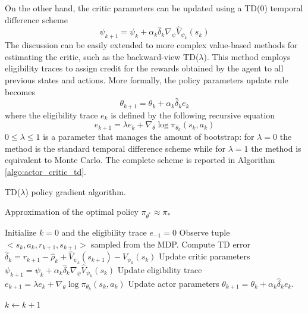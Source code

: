 On the other hand, the critic parameters can be updated using a TD(0) temporal difference scheme
\begin{equation}
	\psi_{k+1} = \psi_k + \alpha_k \widehat{\delta}_k \nabla_\psi \widehat{V}_{\psi_k}(s_k)
\end{equation}
The discussion can be easily extended to more complex value-based methods for estimating the critic, such as the backward-view TD($\lambda$). This method employs eligibility traces to assign credit for the rewards obtained by the agent to all previous states and actions. More formally, the policy parameters update rule becomes
\begin{equation}
	\theta_{k+1} = \theta_k + \alpha_k \widehat{\delta}_k e_k
\end{equation}
where the eligibility trace $e_k$ is defined by the following recursive equation 
\begin{equation}
	e_{k+1} = \lambda e_k + \nabla_\theta\log \pi_{\theta_k}(s_k,a_k) 
\end{equation} 
$0 \leq \lambda \leq 1$ is a parameter that manages the amount of bootstrap: for $\lambda = 0$ the method is the standard temporal difference scheme while for $\lambda = 1$ the method is equivalent to Monte Carlo. The complete scheme is reported in Algorithm \ref{algo:actor_critic_td}. 
\begin{algorithm}[t!]
	\caption{TD($\lambda$) policy gradient algorithm.}
	\label{algo:actor_critic_td}
	\begin{algorithmic}[0]
		\Ensure Approximation of the optimal policy $\pi_{\theta^*} \approx \pi_*$
		\begin{algorithmic}[1]
		\State Initialize $k = 0$ and the eligibility trace $e_{-1} = 0$
		\Repeat
			\State Observe tuple $<s_k, a_k, r_{k+1}, s_{k+1}>$ sampled from the MDP.
			\State Compute TD error $\widehat{\delta}_k = r_{k+1} - \widehat{\rho}_k + \widehat{V}_{\psi_k}(s_{k+1}) - \widehat{V}_{\psi_k}(s_k) $
			\State Update critic parameters $	\psi_{k+1} = \psi_k + \alpha_k \widehat{\delta}_k \nabla_\psi \widehat{V}_{\psi_k}(s_k)$ 
			\State Update eligibility trace $e_{k+1} = \lambda e_k + \nabla_\theta\log \pi_{\theta_k}(s_k,a_k)$
			\State Update actor parameters $\theta_{k+1} = \theta_k + \alpha_k \widehat{\delta}_k e_k $. 
			
			\State $k \leftarrow k + 1$
		\end{algorithmic}
	\end{algorithmic}
\end{algorithm}


